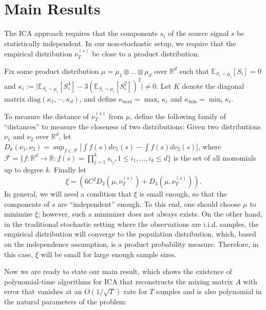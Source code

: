 \documentclass{article}
\newcommand{\E}{\mathbb{E}}
\newcommand{\real}{\mathbb{R}}
\newcommand{\R}{\real}
\newcommand{\iid}{i.i.d.\xspace}
\theoremstyle{definition}
\newtheorem{remark}[lemma]{Remark}
\begin{document}
\section{Main Results}
\label{sec:main}

The ICA approach requires that the components $s_i$ of the source signal $s$ be statistically independent. In our non-stochastic setup, we require that the empirical distribution $\nu_T^{(s)}$ be close to a product distribution.

Fix some product distribution $\mu= \mu_1\otimes \ldots \otimes \mu_d$ over $\R^d$ 
such that $\E_{S_i\sim\mu_i}[S_i]=0$ and $\kappa_i := \vert \E_{S_i\sim \mu_i}[S_i^4] - 3\left(\E_{S_i\sim \mu_i}[S_i^2]\right)^2 \vert \neq 0$. Let
$K$ denote the diagonal matrix $\text{diag}(\kappa_1,\cdots,\kappa_d)$, and define $\kappa_{\max}=\max_{i} \kappa_i$ and $\kappa_{\min}=\min_{i} \kappa_i$.

To measure the distance of $\nu_T^{(s)}$ from $\mu$, define the following family of ``distances'' to measure the closeness of two distributions: Given two distributions $\nu_1$ and $\nu_2$ over $\R^d$, let $D_k(\nu_1,\nu_2) = \sup_{f\in\mathcal{F}} |\int f(s)d\nu_1(s) - \int f(s)d\nu_2(s)|$, where $\mathcal{F}=\{f:\R^d \to \R : f(s)=\prod_{j=1}^k s_{i_j}, 1 \le i_1,\ldots,i_k \le d\}$ is the set of all monomials up to degree $k$. Finally let
\begin{equation}
\label{eq:xi}
\xi = \left( 6C^2D_2(\mu, \nu_T^{(s)}) + D_4(\mu, \nu_T^{(s)})\right).
\end{equation}
In general, we will need a condition that $\xi$ is small enough, so that the components of $s$ are ``independent'' enough. To this end, one should choose
$\mu$ to minimize $\xi$; however, such a minimizer does not always exists.
On the other hand, in the traditional stochastic setting where the observations are \iid samples, the empirical distribution will converge to the population distribution, which, based on the independence assumption, is a product probability measure. 
Therefore, in this case, $\xi$ will be small for large enough sample sizes. 

Now we are ready to state our main result, which shows the existence of polynomial-time algorithms for ICA that reconstructs the mixing matrix $A$ 
with error that vanishes at an $O(1/\sqrt{T})$ rate for $T$ samples and is also polynomial in the natural parameters of the problem:
\end{document}
